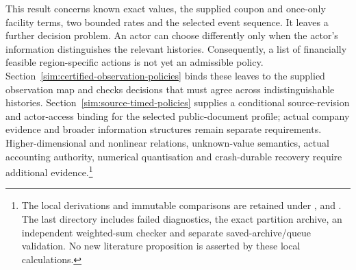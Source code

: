 This result concerns known exact values, the supplied coupon and once-only facility terms, two bounded rates and the selected event sequence. It leaves a further decision problem. An actor can choose differently only when the actor's information distinguishes the relevant histories. Consequently, a list of financially feasible region-specific actions is not yet an admissible policy. Section~\ref{sim:certified-observation-policies} binds these leaves to the supplied observation map and checks decisions that must agree across indistinguishable histories. Section~\ref{sim:source-timed-policies} supplies a conditional source-revision and actor-access binding for the selected public-document profile; actual company evidence and broader information structures remain separate requirements. Higher-dimensional and nonlinear relations, unknown-value semantics, actual accounting authority, numerical quantisation and crash-durable recovery require additional evidence.\footnote{The local derivations and immutable comparisons are retained under ,  and . The last directory includes failed diagnostics, the exact partition archive, an independent weighted-sum checker and separate saved-archive/queue validation. No new literature proposition is asserted by these local calculations.}
